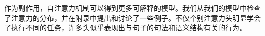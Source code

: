 



作为副作用，自注意力机制可以得到更多可解释的模型。我们从我们的模型中检查了注意力的分布，并在附录中提出和讨论了一些例子。不仅个别注意力头明显学会了执行不同的任务，许多头似乎表现出与句子的句法和语义结构有关的行为。
